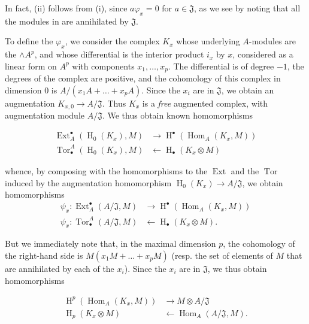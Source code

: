 In fact, (ii) follows from (i), since $a\varphi_x=0$ for $a\in\mathfrak{J}$, as we see by noting that all the modules in  are annihilated by $\mathfrak{J}$.

To define the $\varphi_x$, we consider the complex $K_x$ whose underlying $A$-modules are the $\wedge A^p$, and whose differential is the interior product $i_x$ by $x$, considered as a linear form on $A^p$ with components $x_1,\ldots,x_p$.
The differential is of degree $-1$, the degrees of the complex are positive, and the cohomology of this complex in dimension $0$ is $A/(x_1A+\ldots+x_pA)$.
Since the $x_i$ are in $\mathfrak{J}$, we obtain an augmentation $K_{x,0}\to A/\mathfrak{J}$.
Thus $K_x$ is a \emph{free} augmented complex, with augmentation module $A/\mathfrak{J}$.
We thus obtain known homomorphisms

\begin{align*}
  \operatorname{Ext}_A^\bullet(\operatorname{H}_0(K_x),M) & \to \operatorname{H}^\bullet(\operatorname{Hom}_A(K_x,M))
  \\\operatorname{Tor}_\bullet^A(\operatorname{H}_0(K_x),M) &\leftarrow \operatorname{H}_\bullet(K_x\otimes M)
\end{align*}

whence, by composing with the homomorphisms to the $\operatorname{Ext}$ and the $\operatorname{Tor}$ induced by the augmentation homomorphism $\operatorname{H}_0(K_x)\to A/\mathfrak{J}$, we obtain homomorphisms
\begin{equation}\tag{3.3}\label{fga1-equation-3.3}
  \begin{aligned}
    \psi_x\colon \operatorname{Ext}_A^\bullet(A/\mathfrak{J},M)
     & \to \operatorname{H}^\bullet(\operatorname{Hom}_A(K_x,M))
    \\\psi_x\colon \operatorname{Tor}_\bullet^A(A/\mathfrak{J},M)
     & \leftarrow \operatorname{H}_\bullet(K_x\otimes M).
\end{aligned}
\end{equation}

But we immediately note that, in the maximal dimension $p$, the cohomology of the right-hand side is $M(x_1M+\ldots+x_pM)$ (resp. the set of elements of $M$ that are annihilated by each of the $x_i$).
Since the $x_i$ are in $\mathfrak{J}$, we thus obtain homomorphisms


\begin{equation}\tag{3.4}\label{fga1-equation-3.4}
  \begin{aligned}
    \operatorname{H}^p(\operatorname{Hom}_A(K_x,M)) & \to M\otimes A/\mathfrak{J}
    \\\operatorname{H}_p(K_x\otimes M) &\leftarrow \operatorname{Hom}_A(A/\mathfrak{J},M).
  \end{aligned}
\end{equation}


